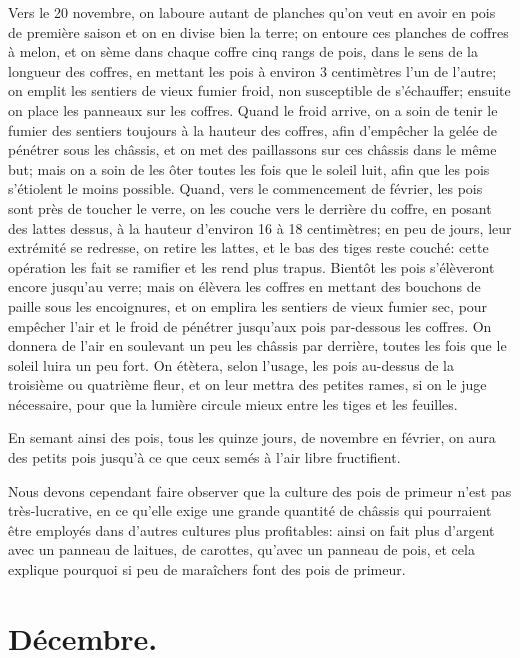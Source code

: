 \documentclass[10pt,a4paper]{book}
\begin{document}
Vers le 20 novembre, on laboure autant de planches qu'on veut en avoir en pois de première saison et on en divise bien la terre; on entoure ces planches de coffres à melon, et on sème dans chaque coffre cinq rangs de pois, dans le sens de la longueur des coffres, en mettant les pois à environ 3 centimètres l'un de l'autre; on emplit les sentiers de vieux fumier froid, non susceptible de s'échauffer; ensuite on place les panneaux sur les coffres. Quand le froid arrive, on a soin de tenir le fumier des sentiers toujours à la hauteur des coffres, afin d'empêcher la gelée de pénétrer sous les châssis, et on met des paillassons sur ces châssis dans le même but; mais on a soin de les ôter toutes les fois que le soleil luit, afin que les pois s'étiolent le moins possible. Quand, vers le commencement de février, les pois sont près de toucher le verre, on les couche vers le derrière du coffre, en posant des lattes dessus, à la hauteur d'environ 16 à 18 centimètres; en peu de jours, leur extrémité se redresse, on retire les lattes, et le bas des tiges reste couché: cette opération les fait se ramifier et les rend plus trapus. Bientôt les pois s'élèveront encore jusqu'au verre; mais on élèvera les coffres en mettant des bouchons de paille sous les encoignures, et on emplira les sentiers de vieux fumier sec, pour empêcher l'air et le froid de pénétrer jusqu'aux pois par-dessous les coffres. On donnera de l'air en soulevant un peu les châssis par derrière, toutes les fois que le soleil luira un peu fort. On étètera, selon l'usage, les pois au-dessus de la troisième ou quatrième fleur, et on leur mettra des petites rames, si on le juge nécessaire, pour que la lumière circule mieux entre les tiges et les feuilles.

En semant ainsi des pois, tous les quinze jours, de novembre en février, on aura des petits pois jusqu'à ce que ceux semés à l'air libre fructifient.

Nous devons cependant faire observer que la culture des pois de primeur n'est pas très-lucrative, en ce qu'elle exige une grande quantité de châssis qui pourraient être employés dans d'autres cultures plus profitables: ainsi on fait plus d'argent avec un panneau de laitues, de carottes, qu'avec un panneau de pois, et cela explique pourquoi si peu de maraîchers font des pois de primeur.

\section{Décembre.}
\end{document}
